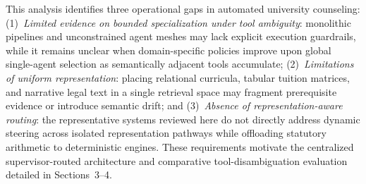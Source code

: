 This analysis identifies three operational gaps in automated university counseling: (1)~\emph{Limited evidence on bounded specialization under tool ambiguity}: monolithic pipelines and unconstrained agent meshes may lack explicit execution guardrails, while it remains unclear when domain-specific policies improve upon global single-agent selection as semantically adjacent tools accumulate; (2)~\emph{Limitations of uniform representation}: placing relational curricula, tabular tuition matrices, and narrative legal text in a single retrieval space may fragment prerequisite evidence or introduce semantic drift; and (3)~\emph{Absence of representation-aware routing}: the representative systems reviewed here do not directly address dynamic steering across isolated representation pathways while offloading statutory arithmetic to deterministic engines. These requirements motivate the centralized supervisor-routed architecture and comparative tool-disambiguation evaluation detailed in Sections~3--4.
